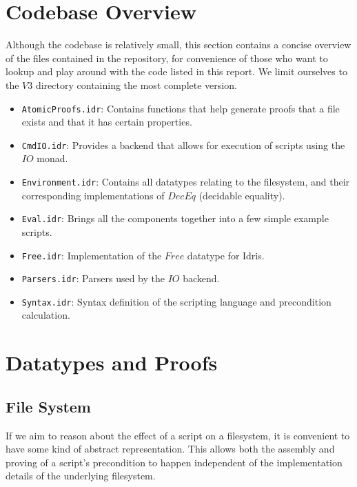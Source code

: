 \documentclass[12pt,a4paper]{article}
\newcommand{\Conid}[1]{\mathit{#1}}
\begin{document}
\section{Codebase Overview}

Although the codebase is relatively small, this section contains a concise overview of the files contained in the repository, for convenience of those who want to lookup and play around with the code listed in this report. We limit ourselves to the \ensuremath{\Conid{V3}} directory containing the most complete version. 

\begin{itemize}
\item
\texttt{AtomicProofs.idr}: Contains functions that help generate proofs that a file exists and that it has certain properties. 

\item
\texttt{CmdIO.idr}: Provides a backend that allows for execution of scripts using the \ensuremath{\Conid{IO}} monad. 

\item
\texttt{Environment.idr}: Contains all datatypes relating to the filesystem, and their corresponding implementations of \ensuremath{\Conid{DecEq}} (decidable equality). 

\item
\texttt{Eval.idr}: Brings all the components together into a few simple example scripts. 

\item
\texttt{Free.idr}: Implementation of the \ensuremath{\Conid{Free}} datatype for Idris. 

\item
\texttt{Parsers.idr}: Parsers used by the \ensuremath{\Conid{IO}} backend. 

\item
\texttt{Syntax.idr}: Syntax definition of the scripting language and precondition calculation. 
\end{itemize}

\section{Datatypes and Proofs}

\subsection{File System}

If we aim to reason about the effect of a script on a filesystem, it is convenient to have some kind of abstract representation. This allows both the assembly and proving of a script's precondition to happen independent of the implementation details of the underlying filesystem. 
\end{document}

